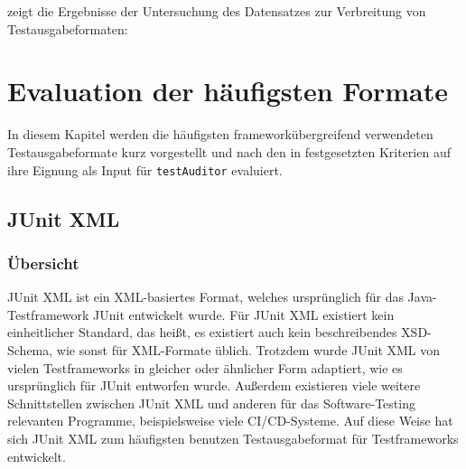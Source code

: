  zeigt die Ergebnisse der Untersuchung des Datensatzes zur Verbreitung von Testausgabeformaten:

\newpage

\section{Evaluation der häufigsten Formate}
In diesem Kapitel werden die häufigsten frameworkübergreifend verwendeten Testausgabeformate kurz vorgestellt und nach den in  festgesetzten Kriterien auf ihre Eignung als Input für \texttt{testAuditor} evaluiert.

\subsection{JUnit XML}\label{JUNIT}
\subsubsection{Übersicht}
JUnit XML ist ein XML-basiertes Format, welches ursprünglich für das Java-Testframework JUnit entwickelt wurde. Für JUnit XML existiert kein einheitlicher Standard, das heißt, es existiert auch kein beschreibendes XSD-Schema, wie sonst für XML-Formate üblich. Trotzdem wurde JUnit XML von vielen Testframeworks in gleicher oder ähnlicher Form adaptiert, wie es ursprünglich für JUnit entworfen wurde. Außerdem existieren viele weitere Schnittstellen zwischen JUnit XML und anderen für das Software-Testing relevanten Programme, beispielsweise viele CI/CD-Systeme. %
Auf diese Weise hat sich JUnit XML zum häufigsten benutzen Testausgabeformat für Testframeworks entwickelt.

